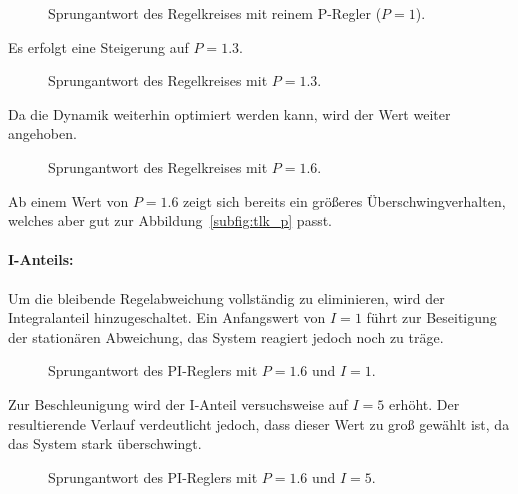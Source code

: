 \documentclass[11pt,a4paper]{article}
\begin{document}
\begin{figure}[H]
    \centering
    
    
    \caption{Sprungantwort des Regelkreises mit reinem P-Regler ($P=1$).}
    \label{fig:step_response_P1}
\end{figure}

Es erfolgt eine Steigerung auf $P = 1.3$.

\begin{figure}[H]
    \centering

    
    \caption{Sprungantwort des Regelkreises mit $P=1.3$.}
    \label{fig:step_response_P1k3}
\end{figure}

Da die Dynamik weiterhin optimiert werden kann, wird der Wert weiter angehoben. 

\begin{figure}[H]
    \centering

    
    \caption{Sprungantwort des Regelkreises mit $P=1.6$.}
    \label{fig:step_response_P1k6}
\end{figure}
Ab einem Wert von $P = 1.6$ zeigt sich bereits ein größeres Überschwingverhalten, welches aber gut zur Abbildung~\ref{subfig:tlk_p} passt.

\paragraph{I-Anteils:}
Um die bleibende Regelabweichung vollständig zu eliminieren, wird der Integralanteil hinzugeschaltet. Ein Anfangswert von $I = 1$ führt zur Beseitigung der stationären Abweichung, das System reagiert jedoch noch zu träge.

\begin{figure}[H]
    \centering

    
    \caption{Sprungantwort des PI-Reglers mit $P=1.6$ und $I=1$.}
    \label{fig:step_response_I1}
\end{figure}

Zur Beschleunigung wird der I-Anteil versuchsweise auf $I = 5$ erhöht. Der resultierende Verlauf verdeutlicht jedoch, dass dieser Wert zu groß gewählt ist, da das System stark überschwingt.

\begin{figure}[H]
    \centering

    
    \caption{Sprungantwort des PI-Reglers mit $P=1.6$ und $I=5$.}
    \label{fig:step_response_I5}
\end{figure}
\end{document}
